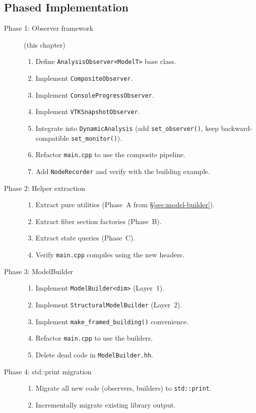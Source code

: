 \subsection{Phased Implementation}

\begin{description}
  \item[Phase 1: Observer framework] (this chapter)
    \begin{enumerate}
      \item Define \texttt{AnalysisObserver<ModelT>} base class.
      \item Implement \texttt{CompositeObserver}.
      \item Implement \texttt{ConsoleProgressObserver}.
      \item Implement \texttt{VTKSnapshotObserver}.
      \item Integrate into \texttt{DynamicAnalysis}
            (add \texttt{set\_observer()}, keep backward-compatible
            \texttt{set\_monitor()}).
      \item Refactor \texttt{main.cpp} to use the composite pipeline.
      \item Add \texttt{NodeRecorder} and verify with the building example.
    \end{enumerate}

  \item[Phase 2: Helper extraction]
    \begin{enumerate}
      \item Extract pure utilities (Phase~A from
            \S\ref{sec:model-builder}).
      \item Extract fiber section factories (Phase~B).
      \item Extract state queries (Phase~C).
      \item Verify \texttt{main.cpp} compiles using the new headers.
    \end{enumerate}

  \item[Phase 3: ModelBuilder]
    \begin{enumerate}
      \item Implement \texttt{ModelBuilder<dim>} (Layer~1).
      \item Implement \texttt{StructuralModelBuilder} (Layer~2).
      \item Implement \texttt{make\_framed\_building()} convenience.
      \item Refactor \texttt{main.cpp} to use the builders.
      \item Delete dead code in \texttt{ModelBuilder.hh}.
    \end{enumerate}

  \item[Phase 4: std::print migration]
    \begin{enumerate}
      \item Migrate all new code (observers, builders) to
            \texttt{std::print}.
      \item Incrementally migrate existing library output.
    \end{enumerate}
\end{description}


